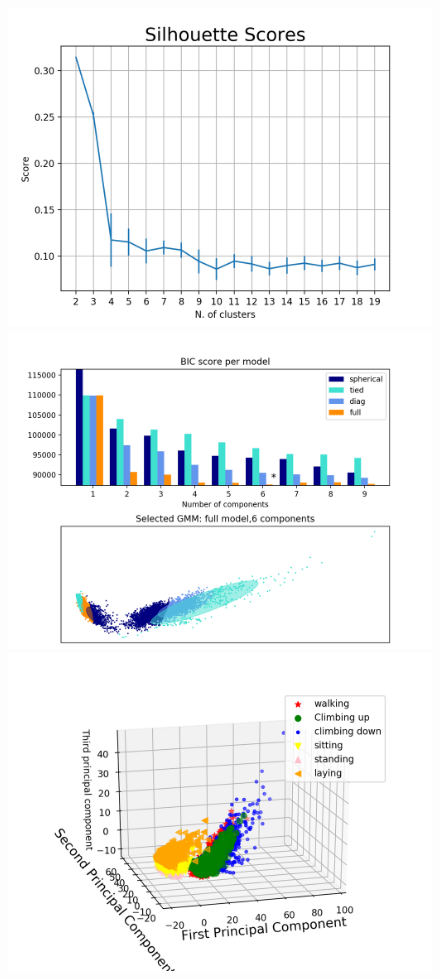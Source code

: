 \documentclass[a4paper,12pt]{article}
\begin{document}
\begin{figure}[!htb]
   \begin{minipage}{0.33\textwidth}
     \centering
     \includegraphics[width=.95\linewidth]{gmm_sil_1}
   \end{minipage}\hfill
    \begin{minipage}{0.33\textwidth}
     \centering
     \includegraphics[width=.95\linewidth]{em_pca_d2}
     \end{minipage}\hfill
     \begin{minipage}{0.33\textwidth}
     \centering
     \includegraphics[width=.95\linewidth]{pca_data_set_2}

\end{minipage}
\end{figure}
\end{document}
